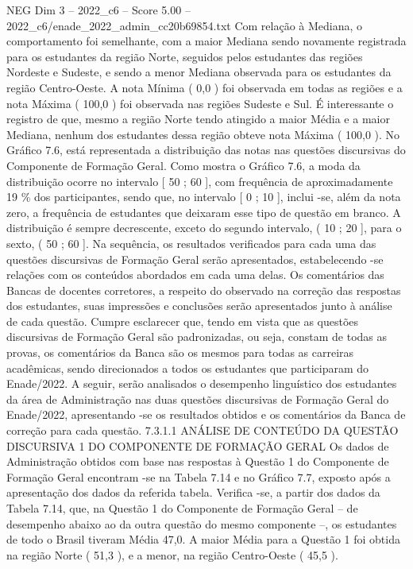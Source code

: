 \begin{textsample}{NEG Dim 3 – 2022\_c6 – Score 5.00 – 2022\_c6/enade\_2022\_admin\_cc20b69854.txt}
Com relação à Mediana, o comportamento foi semelhante, com a maior Mediana sendo novamente registrada para os estudantes da região Norte, seguidos pelos estudantes das regiões Nordeste e Sudeste, e sendo a menor Mediana observada para os estudantes da região Centro-Oeste.
A nota Mínima ( 0,0 ) foi observada em todas as regiões e a nota Máxima ( 100,0 ) foi observada nas regiões Sudeste e Sul.
É interessante o registro de que, mesmo a região Norte tendo atingido a maior Média e a maior Mediana, nenhum dos estudantes dessa região obteve nota Máxima ( 100,0 ).
No Gráfico 7.6, está representada a distribuição das notas nas questões discursivas do Componente de Formação Geral.
Como mostra o Gráfico 7.6, a moda da distribuição ocorre no intervalo [ 50 ; 60 ], com frequência de aproximadamente 19 \% dos participantes, sendo que, no intervalo [ 0 ; 10 ], inclui -se, além da nota zero, a frequência de estudantes que deixaram esse tipo de questão em branco.
A distribuição é sempre decrescente, exceto do segundo intervalo, ( 10 ; 20 ], para o sexto, ( 50 ; 60 ].
Na sequência, os resultados verificados para cada uma das questões discursivas de Formação Geral serão apresentados, estabelecendo -se relações com os conteúdos abordados em cada uma delas.
Os comentários das Bancas de docentes corretores, a respeito do observado na correção das respostas dos estudantes, suas impressões e conclusões serão apresentados junto à análise de cada questão.
Cumpre esclarecer que, tendo em vista que as questões discursivas de Formação Geral são padronizadas, ou seja, constam de todas as provas, os comentários da Banca são os mesmos para todas as carreiras acadêmicas, sendo direcionados a todos os estudantes que participaram do Enade/2022.
A seguir, serão analisados o desempenho linguístico dos estudantes da área de Administração nas duas questões discursivas de Formação Geral do Enade/2022, apresentando -se os resultados obtidos e os comentários da Banca de correção para cada questão. 7.3.1.1 ANÁLISE DE CONTEÚDO DA QUESTÃO DISCURSIVA 1 DO COMPONENTE DE FORMAÇÃO GERAL Os dados de Administração obtidos com base nas respostas à Questão 1 do Componente de Formação Geral encontram -se na Tabela 7.14 e no Gráfico 7.7, exposto após a apresentação dos dados da referida tabela.
Verifica -se, a partir dos dados da Tabela 7.14, que, na Questão 1 do Componente de Formação Geral – de desempenho abaixo ao da outra questão do mesmo componente –, os estudantes de todo o Brasil tiveram Média 47,0.
A maior Média para a Questão 1 foi obtida na região Norte ( 51,3 ), e a menor, na região Centro-Oeste ( 45,5 ).

\end{textsample}
